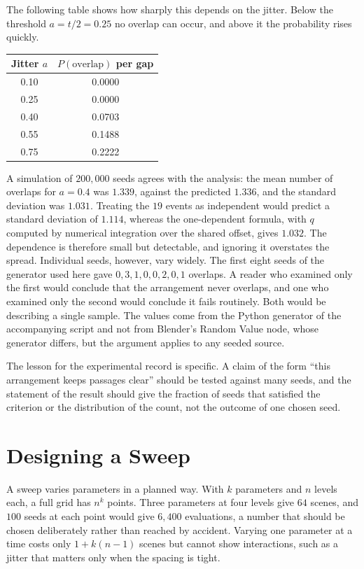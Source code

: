 The following table shows how sharply this depends on the jitter. Below the threshold $a=t/2=0.25$ no overlap can occur, and above it the probability rises quickly.

\begin{center}
\begin{tabular}{@{}cc@{}}
\toprule
Jitter $a$ & $P(\text{overlap})$ per gap\\
\midrule
0.10 & 0.0000\\
0.25 & 0.0000\\
0.40 & 0.0703\\
0.55 & 0.1488\\
0.75 & 0.2222\\
\bottomrule
\end{tabular}
\end{center}

A simulation of $200{,}000$ seeds agrees with the analysis: the mean number of overlaps for $a=0.4$ was $1.339$, against the predicted $1.336$, and the standard deviation was $1.031$. Treating the $19$ events as independent would predict a standard deviation of $1.114$, whereas the one-dependent formula, with $q$ computed by numerical integration over the shared offset, gives $1.032$. The dependence is therefore small but detectable, and ignoring it overstates the spread. Individual seeds, however, vary widely. The first eight seeds of the generator used here gave $0,3,1,0,0,2,0,1$ overlaps. A reader who examined only the first would conclude that the arrangement never overlaps, and one who examined only the second would conclude it fails routinely. Both would be describing a single sample. The values come from the Python generator of the accompanying script and not from Blender's Random Value node, whose generator differs, but the argument applies to any seeded source.

The lesson for the experimental record is specific. A claim of the form ``this arrangement keeps passages clear'' should be tested against many seeds, and the statement of the result should give the fraction of seeds that satisfied the criterion or the distribution of the count, not the outcome of one chosen seed.

\section{Designing a Sweep}

A sweep varies parameters in a planned way. With $k$ parameters and $n$ levels each, a full grid has $n^k$ points. Three parameters at four levels give $64$ scenes, and $100$ seeds at each point would give $6{,}400$ evaluations, a number that should be chosen deliberately rather than reached by accident. Varying one parameter at a time costs only $1+k(n-1)$ scenes but cannot show interactions, such as a jitter that matters only when the spacing is tight.

